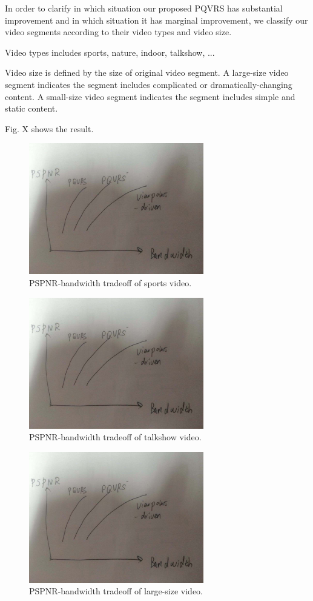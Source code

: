 In order to clarify in which situation our proposed PQVRS has substantial improvement and in which situation it has marginal improvement, we classify our video segments according to their video types and video size.

Video types includes sports, nature, indoor, talkshow, ...

Video size is defined by the size of original video segment. A large-size video segment indicates the segment includes complicated or dramatically-changing content. A small-size video segment indicates the segment includes simple and static content.

Fig. X shows the result.

    \begin{figure}
  \centering
  \includegraphics[width=3in]{images/performance_type.jpeg}
  \caption{PSPNR-bandwidth tradeoff of sports video.}
  \label{rating_res}
  \end{figure}
  
      \begin{figure}
  \centering
  \includegraphics[width=3in]{images/performance_type.jpeg}
  \caption{PSPNR-bandwidth tradeoff of talkshow video.}
  \label{rating_res}
  \end{figure}
  
      \begin{figure}
  \centering
  \includegraphics[width=3in]{images/performance_type.jpeg}
  \caption{PSPNR-bandwidth tradeoff of large-size video.}
  \label{rating_res}
  \end{figure}
  
